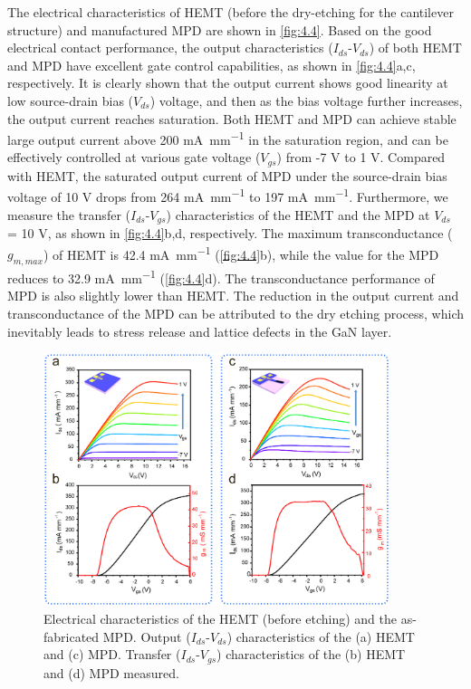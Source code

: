 The  electrical  characteristics of HEMT (before the dry-etching for the cantilever  structure) and manufactured MPD are shown in \autoref{fig:4.4}. Based on the good electrical contact performance, the output characteristics ($I_{ds}$-$V_{ds}$) of both HEMT  and MPD have excellent gate control capabilities, as shown in \autoref{fig:4.4}a,c, respectively. It is clearly shown that the output current shows good linearity at low source-drain  bias ($V_{ds}$) voltage, and then as the bias voltage further increases, the output current reaches saturation. Both HEMT  and MPD can achieve stable large output current  above 200 \unit{\mA\per\mm} in the saturation region, and can be effectively controlled at various gate voltage  ($V_{gs}$) from -7 \unit{\V} to 1 \unit{\V}. Compared with HEMT, the saturated output current of MPD under the source-drain bias voltage of 10 \unit{\V} drops from 264 \unit{\mA\per\mm} to 197 \unit{\mA\per\mm}. Furthermore, we measure the transfer ($I_{ds}$-$V_{gs}$) characteristics of the HEMT and the MPD at $V_{ds}$ = 10 \unit{\V}, as shown in \autoref{fig:4.4}b,d, respectively. The maximum transconductance  ($g_{m, max}$) of HEMT is 42.4 \unit{\mA\per\mm} (\autoref{fig:4.4}b), while the value for the MPD reduces to 32.9 \unit{\mA\per\mm} (\autoref{fig:4.4}d). The transconductance performance of MPD is also slightly lower than HEMT. The reduction in the output current and transconductance of the MPD can be attributed to the dry etching  process, which inevitably leads to stress release and  lattice defects  in the GaN layer. 

\begin{figure}[H] 
\centering    
\includegraphics[width=0.9\textwidth]{ch4_4}
\caption[Electrical characteristics of the HEMT (before etching) and the as-fabricated MPD]{Electrical characteristics of the HEMT (before etching) and the as-fabricated MPD. Output ($I_{ds}$-$V_{ds}$) characteristics of the (a) HEMT and (c) MPD. Transfer ($I_{ds}$-$V_{gs}$) characteristics of the (b) HEMT and (d) MPD measured.}
\label{fig:4.4}
\end{figure}

